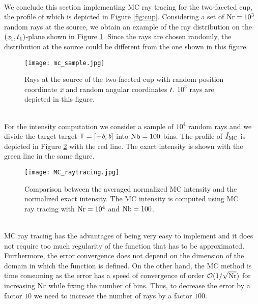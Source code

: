 \\ \indent
We conclude this section implementing MC ray tracing for the two-faceted cup, the profile of which is depicted in Figure \ref{fig:cup}. 
Considering a set of $\textrm{Nr} = 10^3$ random rays 
at the source, we obtain an example of the ray distribution on the $(\textit{x}_1, t_1)$-plane shown in Figure \ref{fig:mc_sample1}. 
Since the rays are chosen randomly, the distribution at the source could be different from the one shown in this figure.
\begin{figure}[h]
\begin{center}
    \texttt{[image: mc\_sample.jpg]}
    \caption{Rays at the source of the two-faceted cup with random position coordinate $\textit{x}$ and random angular coordinates $t$. $10^3$ rays are depicted in this figure.}
    \label{fig:mc_sample1}
\end{center}
  \end{figure}
\\ \indent For the intensity computation we consider a sample of $10^4$ random rays and we divide the target target $\textsf{T} = [-\textit{b}, \textit{b}]$ into $\textrm{Nb}= 100$ bins.
The profile of $\hat{I}_{\textrm{MC}}$ is depicted in Figure \ref{fig:mc_intensity} with the red line. The exact intensity is shown with the green line in the same figure.
\begin{figure}[t]
\begin{center}
    \texttt{[image: MC\_raytracing.jpg]}
    \caption{Comparison between the averaged normalized MC intensity and the normalized exact intensity. The MC intensity is computed using MC ray tracing with $\textrm{Nr} = 10^4$ and $\textrm{Nb} = 100$.}
   \label{fig:mc_intensity}
\end{center}
\end{figure}
\\ \indent MC ray tracing has the advantages of being very easy to implement and it does not require too much regularity of the function that has to be approximated. Furthermore, the error convergence does not depend on the dimension of the domain in which the function is defined.
On the other hand, the MC method is time consuming as the error has a speed of convergence of order $\mathcal{O}(1/\sqrt{\textrm{Nr}})$ for increasing $\textrm{Nr}$ while fixing the number of bins. 
Thus, to decrease the error by a factor $10$ we need to increase the number of rays by a factor $100$.
